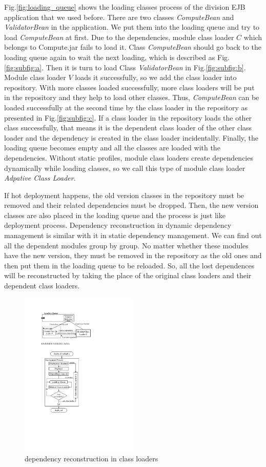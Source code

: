 \documentclass[conference]{IEEEtran}
\begin{document}
Fig.\ref{fig:loading_queue} shows the loading classes process of the division EJB application that we used before. 
There are two classes \emph{ComputeBean} and \emph{ValidatorBean} in the application. 
We put them into the loading queue and try to load \emph{ComputeBean} at first. 
Due to the dependencies, module class loader $C$ which belongs to Compute.jar fails to load it. 
Class \emph{ComputeBean} should go back to the loading queue again to wait the next loading, which is described as Fig.\ref{fig:subfig:a}. 
Then it is turn to load Class \emph{ValidatorBean} in Fig.\ref{fig:subfig:b}. 
Module class loader $V$ loads it successfully, so we add the class loader into repository. 
With more classes loaded successfully, more class loaders will be put in the repository and they help to load other classes. 
Thus, \emph{ComputeBean} can be loaded successfully at the second time by the class loader in the repository as presented in Fig.\ref{fig:subfig:c}.
If a class loader in the repository loads the other class successfully, that means it is the dependent class loader of the other class loader and the dependency is created in the class loader incidentally. 
Finally, the loading queue becomes empty and all the classes are loaded with the dependencies.
Without static profiles, module class loaders create dependencies dynamically while loading classes, so we call this type of module class loader \emph{Adpative Class Loader}.

If hot deployment happens, the old version classes in the repository must be removed and their related dependencies must be dropped. 
Then, the new version classes are also placed in the loading queue and the process is just like deployment process. 
Dependency reconstruction in dynamic dependency management is similar with it in static dependency management. 
We can find out all the dependent modules group by group. 
No matter whether these modules have the new version, they must be removed in the repository as the old ones and then put them in the loading queue to be reloaded. 
So, all the lost dependences will be reconstructed by taking the place of the original class loaders and their dependent class loaders. 

\begin{figure}[ht]
\centering
\includegraphics[width=2.2in]{ProcessReconstructionCL.pdf}
\caption{dependency reconstruction in class loaders}
\label{fig:reconstruction_CL}
\end{figure}
\end{document}
